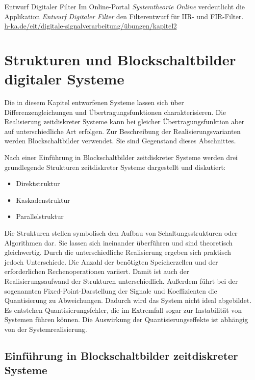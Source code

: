 \begin{application}{Entwurf Digitaler Filter}
  Im Online-Portal \emph{Systemtheorie Online} verdeutlicht die Applikation \emph{Entwurf Digitaler Filter} den Filterentwurf für IIR- und FIR-Filter.
  \tcblower
  \url{h-ka.de/eit/digitale-signalverarbeitung/übungen/kapitel2}
\end{application}


\section{Strukturen und Blockschaltbilder digitaler Systeme}\label{sec:9.6}

Die in diesem Kapitel entworfenen Systeme lassen sich über Differenzengleichungen und Übertragungsfunktionen charakterisieren. Die Realisierung zeitdiskreter Systeme kann bei gleicher Übertragungsfunktion aber auf unterschiedliche Art erfolgen. Zur Beschreibung der Realisierungsvarianten werden Blockschaltbilder verwendet. Sie sind Gegenstand dieses Abschnittes.

Nach einer Einführung in Blockschaltbilder zeitdiskreter Systeme werden drei grundlegende Strukturen zeitdiskreter Systeme dargestellt und diskutiert:

\begin{itemize}
\item
  Direktstruktur
\item
  Kaskadenstruktur
\item
  Parallelstruktur
\end{itemize}

Die Strukturen stellen symbolisch den Aufbau von Schaltungsstrukturen oder Algorithmen dar. Sie lassen sich ineinander überführen und sind theoretisch gleichwertig. Durch die unterschiedliche Realisierung ergeben sich praktisch jedoch Unterschiede. Die Anzahl der benötigten Speicherzellen und der erforderlichen Rechenoperationen variiert. Damit ist auch der Realisierungsaufwand der Strukturen unterschiedlich. Außerdem führt bei der sogenannten Fixed-Point-Darstellung der Signale und Koeffizienten die Quantisierung zu Abweichungen. Dadurch wird das System nicht ideal abgebildet. Es entstehen Quantisierungsfehler, die im Extremfall sogar zur Instabilität von Systemen führen können. Die Auswirkung der Quantisierungseffekte ist abhängig von der Systemrealisierung.

\subsection{Einführung in Blockschaltbilder zeitdiskreter Systeme}\label{sec:einfuxfchrung-in-blockschaltbilder-zeitdiskreter-systeme}

